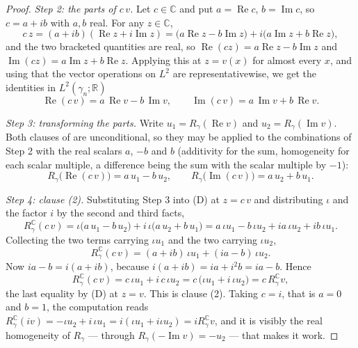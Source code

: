 \begin{proof}
\emph{Step 2: the parts of $c\,v$.}
Let $c \in \mathbb{C}$ and put $a = \operatorname{Re} c$, $b = \operatorname{Im} c$,
so $c = a + ib$ with $a, b$ real.  For any $z \in \mathbb{C}$,
\[
  c\,z = (a + ib)(\operatorname{Re} z + i\operatorname{Im} z)
    = \bigl(a\operatorname{Re} z - b\operatorname{Im} z\bigr)
      + i\bigl(a\operatorname{Im} z + b\operatorname{Re} z\bigr),
\]
and the two bracketed quantities are real, so
$\operatorname{Re}(cz) = a\operatorname{Re} z - b\operatorname{Im} z$ and
$\operatorname{Im}(cz) = a\operatorname{Im} z + b\operatorname{Re} z$.  Applying
this at $z = v(x)$ for almost every $x$, and using that the vector operations on
$L^2$ are representativewise, we get the identities in
$L^2(\gamma_n;\mathbb{R})$
\[
  \operatorname{Re}(c\,v) = a\,\operatorname{Re} v - b\,\operatorname{Im} v,
  \qquad
  \operatorname{Im}(c\,v) = a\,\operatorname{Im} v + b\,\operatorname{Re} v .
\]

\emph{Step 3: transforming the parts.}
Write $u_1 = R_\gamma(\operatorname{Re} v)$ and
$u_2 = R_\gamma(\operatorname{Im} v)$.  Both clauses of
 are unconditional, so they may be applied to the
combinations of Step 2 with the real scalars $a$, $-b$ and $b$ (additivity for
the sum, homogeneity for each scalar multiple, a difference being the sum with
the scalar multiple by $-1$):
\[
  R_\gamma\bigl(\operatorname{Re}(c\,v)\bigr) = a\,u_1 - b\,u_2,
  \qquad
  R_\gamma\bigl(\operatorname{Im}(c\,v)\bigr) = a\,u_2 + b\,u_1 .
\]

\emph{Step 4: clause (2).}
Substituting Step 3 into (D) at $z = c\,v$ and distributing $\iota$ and the
factor $i$ by the second and third facts,
\[
  R_\gamma^{\mathbb{C}}(c\,v)
    = \iota\bigl(a\,u_1 - b\,u_2\bigr) + i\,\iota\bigl(a\,u_2 + b\,u_1\bigr)
    = a\,\iota u_1 - b\,\iota u_2 + ia\,\iota u_2 + ib\,\iota u_1 .
\]
Collecting the two terms carrying $\iota u_1$ and the two carrying $\iota u_2$,
\[
  R_\gamma^{\mathbb{C}}(c\,v)
    = (a + ib)\,\iota u_1 + (ia - b)\,\iota u_2 .
\]
Now $ia - b = i(a + ib)$, because $i(a+ib) = ia + i^2 b = ia - b$.  Hence
\[
  R_\gamma^{\mathbb{C}}(c\,v)
    = c\,\iota u_1 + i\,c\,\iota u_2
    = c\,\bigl(\iota u_1 + i\,\iota u_2\bigr)
    = c\,R_\gamma^{\mathbb{C}} v ,
\]
the last equality by (D) at $z = v$.  This is clause (2).  Taking $c = i$, that
is $a = 0$ and $b = 1$, the computation reads
$R_\gamma^{\mathbb{C}}(iv) = -\iota u_2 + i\,\iota u_1 = i(\iota u_1 + i\iota u_2)
= i R_\gamma^{\mathbb{C}} v$, and it is visibly the real homogeneity of
$R_\gamma$ --- through $R_\gamma(-\operatorname{Im} v) = -u_2$ --- that makes it
work.


\end{proof}
